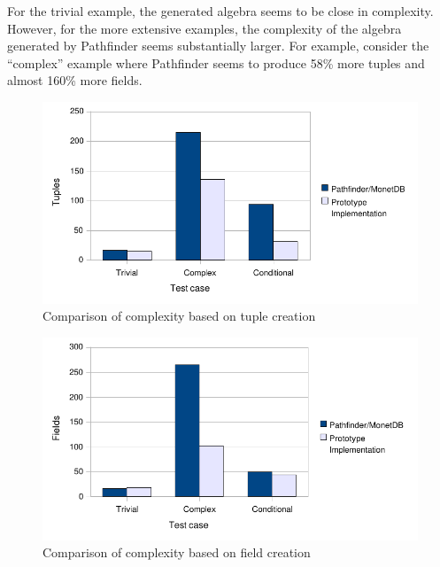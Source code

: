 For the trivial example, the generated algebra seems to be close in complexity.
However, for the more extensive examples, the complexity of the algebra
generated by Pathfinder seems substantially larger. For example, consider the
``complex'' example where Pathfinder seems to produce 58\% more tuples and
almost 160\% more fields.

\begin{figure}[!htp]
\begin{center}
  \includegraphics[width=1.0\textwidth]{diagrams/comparison_chart2_chart1}
  \caption{Comparison of complexity based on tuple creation}
  \label{fig:results:comparison:chart1}
\end{center}
\end{figure}

\begin{figure}[!htp]
\begin{center}
  \includegraphics[width=1.0\textwidth]{diagrams/comparison_chart2_chart2}
  \caption{Comparison of complexity based on field creation}
  \label{fig:results:comparison:chart2}
\end{center}
\end{figure}

